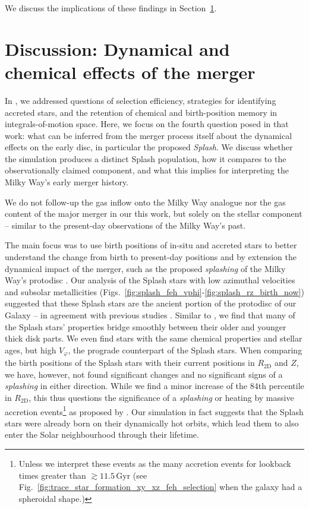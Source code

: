 \documentclass[fleqn,usenatbib]{mnras}
\begin{document}
We discuss the implications of these findings in Section~\ref{sec:discussion}.

\section{Discussion: Dynamical and chemical effects of the merger}
\label{sec:discussion}

In , we addressed questions of selection efficiency, strategies for identifying accreted stars, and the retention of chemical and birth-position memory in integrals-of-motion space. Here, we focus on the fourth question posed in that work: what can be inferred from the merger process itself about the dynamical effects on the early disc, in particular the proposed \textit{Splash}. We discuss whether the simulation produces a distinct Splash population, how it compares to the observationally claimed component, and what this implies for interpreting the Milky Way’s early merger history.

We do not follow-up the gas inflow onto the Milky Way analogue nor the gas content of the major merger \citep[see for example][]{Agertz2021, Renaud2021b, Buck2023} in our this work,  but solely on the stellar component -- similar to the present-day observations of the Milky Way's past.

The main focus was to use birth positions of in-situ and accreted stars to better understand the change from birth to present-day positions and by extension the dynamical impact of the merger, such as the proposed \textit{splashing} of the Milky Way's protodisc \citep{Belokurov2020}. Our analysis of the Splash stars with low azimuthal velocities and subsolar metallicities (Figs.~\ref{fig:splash_feh_vphi}-\ref{fig:splash_rz_birth_now}) suggested that these Splash stars are the ancient portion of the protodisc of our Galaxy -- in agreement with previous studies \citep{Bonaca2017, Haywood2018, DiMatteo2019, Gallart2019, Belokurov2020}. Similar to \citet{Belokurov2020}, we find that many of the Splash stars' properties bridge smoothly between their older and younger thick disk parts. We even find stars with the same chemical properties and stellar ages, but high $V_\varphi$, the prograde counterpart of the Splash stars. When comparing the birth positions of the Splash stars with their current positions in $R_\mathrm{2D}$ and $Z$, we have, however, not found significant changes and no significant signs of a \textit{splashing} in either direction. While we find a minor increase of the 84th percentile in $R_\mathrm{2D}$, this thus questions the significance of a \textit{splashing} or heating by massive accretion events\footnote{Unless we interpret these events as the many accretion events for lookback times greater than $\gtrsim 11.5\,\mathrm{Gyr}$ (see Fig.~\ref{fig:trace_star_formation_xy_xz_feh_selection} when the galaxy had a spheroidal shape.)} as proposed by \citet{Belokurov2020}. Our simulation in fact suggests that the Splash stars were already born on their dynamically hot orbits, which lead them to also enter the Solar neighbourhood through their lifetime.
\end{document}
